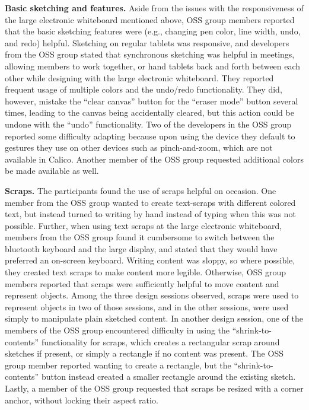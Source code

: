 \textbf{Basic sketching and features.} Aside from the issues with the responsiveness of the large electronic whiteboard mentioned above, OSS group members reported that the basic sketching features were (e.g., changing pen color, line width, undo, and redo) helpful. Sketching on regular tablets was responsive, and developers from the OSS group stated that synchronous sketching was helpful in meetings, allowing members to work together, or hand tablets back and forth between each other while designing with the large electronic whiteboard. They reported frequent usage of multiple colors and the undo/redo functionality.  They did, however, mistake the ``clear canvas'' button for the ``eraser mode'' button several times, leading to the canvas being accidentally cleared, but this action could be undone with the ``undo'' functionality. Two of the developers in the OSS group reported some difficulty adapting because upon using the device they default to gestures they use on other devices such as pinch-and-zoom, which are not available in Calico. Another member of the OSS group requested additional colors be made available as well.

\textbf{Scraps.} The participants found the use of scraps helpful on occasion. One member from the OSS group wanted to create text-scraps with different colored text, but instead turned to writing by hand instead of typing when this was not possible. Further, when using text scraps at the large electronic whiteboard, members from the OSS group found it cumbersome to switch between the bluetooth keyboard and the large display, and stated that they would have preferred an on-screen keyboard. Writing content was sloppy, so where possible, they created text scraps to make content more legible. Otherwise, OSS group members reported that scraps were sufficiently helpful to move content and represent objects. Among the three design sessions observed, scraps were used to represent objects in two of those sessions, and in the other sessions, were used simply to manipulate plain sketched content.  In another design session, one of the members of the OSS group encountered difficulty in using the ``shrink-to-contents'' functionality for scraps, which creates a rectangular scrap around sketches if present, or simply a rectangle if no content was present. The OSS group member reported wanting to create a rectangle, but the ``shrink-to-contents'' button instead created a smaller rectangle around the existing sketch. Lastly, a member of the OSS group requested that scraps be resized with a corner anchor, without locking their aspect ratio.

